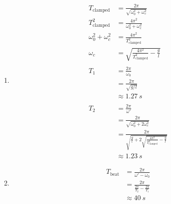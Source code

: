 \documentclass{article}
\begin{document}
\begin{enumerate}
  \item

        \begin{align*}
          T_\text{clamped}        & = \frac{2 \pi}{\sqrt{\omega_0^2 + \omega_c^2}}                                                 \\
          T_\text{clamped}^2      & = \frac{4 \pi^2}{\omega_0^2 + \omega_c^2}                                                      \\
          \omega_0^2 + \omega_c^2 & = \frac{4 \pi^2}{T_\text{clamped}^2}                                                           \\
          \omega_c                & = \sqrt{\frac{4 \pi^2}{T_\text{clamped}^2} - \frac{g}{l}}                                      \\ \\
          T_1                     & = \frac{2 \pi}{\omega_0}                                                                       \\
                                  & = \frac{2 \pi}{\sqrt{g / l}}                                                                   \\
                                  & \approx \qty{1.27}{s}                                                                          \\ \\
          T_2                     & = \frac{2 \pi}{\omega'}                                                                        \\
                                  & = \frac{2 \pi}{\sqrt{\omega_0^2 + 2 \omega_c^2}}                                               \\
                                  & = \frac{2 \pi}{\sqrt{\frac{g}{l} + 2 \sqrt{\frac{4 \pi^2}{T_\text{clamped}^2} - \frac{g}{l}}}} \\
                                  & \approx \qty{1.23}{s}
        \end{align*}

  \item

        \begin{align*}
          T_\text{beat} & = \frac{2 \pi}{\omega' -
          \omega_0}                                                             \\
                        & = \frac{2 \pi}{\frac{2 \pi}{T_2} - \frac{2 \pi}{T_1}} \\
                        & \approx \qty{40}{s}
        \end{align*}
\end{enumerate}
\end{document}
